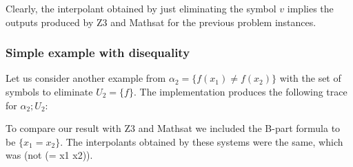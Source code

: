 Clearly, the interpolant obtained by just eliminating the symbol $v$ implies
the outputs produced by Z3 and Mathsat for the previous problem instances.

\subsubsection{Simple example with disequality}

Let us consider another example from \cite{KAPUR2017} 
$\alpha_2 = \{f(x_1) \neq f(x_2)\}$
with the set of symbols to eliminate $U_2 = \{f\}$. The implementation produces the following
trace for $\alpha_2; U_2$:



To compare our result with Z3 and Mathsat we 
included the B-part formula to be $\{x_1 = x_2\}$.
The interpolants obtained by these systems were the 
same, which was (not (= x1 x2)).

